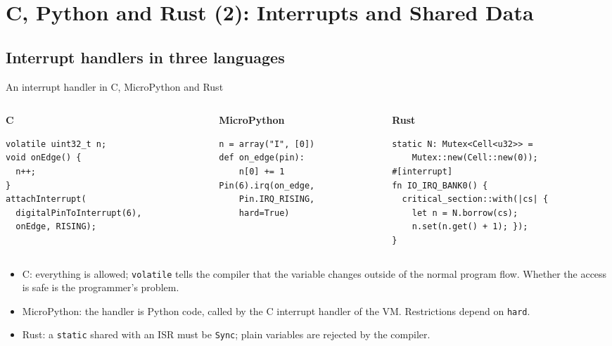 \section{C, Python and Rust (2): Interrupts and Shared Data}
\label{sec:langconc}
\scriptonly{\sloppy}

\subsection{Interrupt handlers in three languages}
\begin{frame}[fragile]{An interrupt handler in C, MicroPython and Rust}
  \begin{columns}[T]
    \begin{column}{0.33\textwidth}
      \scriptsize\textbf{C}
\begin{lstlisting}[numbers=none]
volatile uint32_t n;
void onEdge() {
  n++;
}
attachInterrupt(
  digitalPinToInterrupt(6),
  onEdge, RISING);
\end{lstlisting}
    \end{column}
    \begin{column}{0.30\textwidth}
      \scriptsize\textbf{MicroPython}
\begin{lstlisting}[style=python,numbers=none]
n = array("I", [0])
def on_edge(pin):
    n[0] += 1
Pin(6).irq(on_edge,
    Pin.IRQ_RISING,
    hard=True)
\end{lstlisting}
    \end{column}
    \begin{column}{0.35\textwidth}
      \scriptsize\textbf{Rust}
\begin{lstlisting}[style=rust,numbers=none]
static N: Mutex<Cell<u32>> =
    Mutex::new(Cell::new(0));
#[interrupt]
fn IO_IRQ_BANK0() {
  critical_section::with(|cs| {
    let n = N.borrow(cs);
    n.set(n.get() + 1); });
}
\end{lstlisting}
    \end{column}
  \end{columns}
  \begin{itemize}
    \small
    \item C: everything is allowed; \texttt{volatile} tells the compiler that the variable changes outside of the normal program flow. Whether the access is safe is the programmer's problem.
    \item MicroPython: the handler is Python code, called by the C interrupt handler of the VM. Restrictions depend on \texttt{hard}.
    \item Rust: a \texttt{static} shared with an ISR must be \texttt{Sync}; plain variables are rejected by the compiler.
  \end{itemize}
\end{frame}

